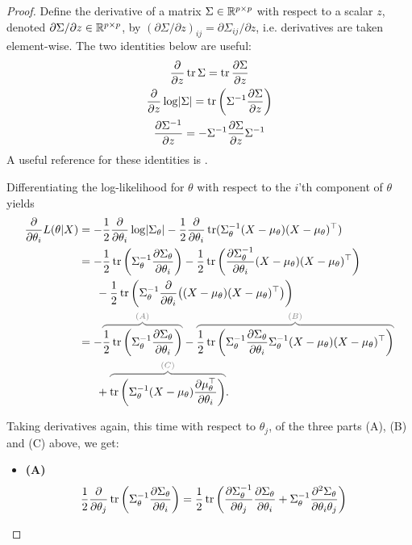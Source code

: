 \begin{proof}
Define the derivative of a matrix $\Sigma \in \mathbb{R}^{p\times p}$ with respect to a scalar $z$, denoted $\partial\Sigma/\partial z \in \mathbb{R}^{p\times p}$, by $(\partial\Sigma/\partial z)_{ij} = \partial \Sigma_{ij}/\partial z$, i.e. derivatives are taken element-wise.
The two identities below are useful:
\begin{gather}
  \frac{\partial}{\partial z} \operatorname{tr}\Sigma = \operatorname{tr} \frac{\partial\Sigma}{\partial z} \\
  \frac{\partial}{\partial z} \log \lvert\Sigma\rvert = \operatorname{tr}\left( \Sigma^{-1} \frac{\partial\Sigma}{\partial z} \right) \\
  \frac{\partial\Sigma^{-1}}{\partial z} = -\Sigma^{-1} \frac{\partial\Sigma}{\partial z}\Sigma^{-1}
\end{gather}
A useful reference for these identities is \citet{petersen2008matrix}.

Differentiating the log-likelihood for $\theta$ with respect to the $i$'th component of $\theta$ yields
\begin{align*}
\frac{\partial}{\partial \theta_i} L(\theta|X) 
  &= -\half \frac{\partial}{\partial \theta_i} \log \abs{\Sigma_\theta} - \half \frac{\partial}{\partial \theta_i} \tr(\Sigma_\theta^{-1}\Xmu\Xmu^\top) \\
  &= -\half \tr \left(\Sigma_\theta^{-1} \frac{\partial\Sigma_\theta}{\partial \theta_i}  \right) - \half \tr \left( \frac{\partial\Sigma_\theta^{-1}}{\partial \theta_i} \Xmu\Xmu^\top \right)   \\
  &\phantom{==} - \half \tr \left( \Sigma_\theta^{-1} \frac{\partial}{\partial \theta_i}\big( \Xmu\Xmu^\top \big) \right) \\
  &= -\myoverbrace{\half \tr \left( \Sigma_\theta^{-1} \frac{\partial\Sigma_\theta}{\partial \theta_i}\right)}{(A)}
  - \myoverbrace{\half \tr \left( \Sigma_\theta^{-1} \frac{\partial\Sigma_\theta}{\partial \theta_i}\Sigma_\theta^{-1} \Xmu\Xmu^\top \right)}{(B)} \\
  &\phantom{==}  + \myoverbrace{\tr \left( \Sigma_\theta^{-1}\Xmu\dmuitop \right)}{(C)}.
\end{align*}

Taking derivatives again, this time with respect to $\theta_j$, of the three parts (A), (B) and (C) above, we get:

\begin{itemize}
  \item \textbf{(A)}
  \begin{align*}
    \frac{1}{2} \frac{\partial}{\partial \theta_j}  \operatorname{tr} \left( 
    \Sigma_\theta^{-1} \frac{\partial\Sigma_\theta}{\partial \theta_i}
    \right) 
    &= \frac{1}{2} \operatorname{tr} \left( \frac{\partial\Sigma_\theta^{-1}}{\partial \theta_j} \frac{\partial\Sigma_\theta}{\partial \theta_i} + \Sigma_\theta^{-1} \frac{\partial^2\Sigma_\theta}{\partial \theta_i\theta_j} \right)
  \end{align*} 
  

\end{itemize}
\end{proof}
